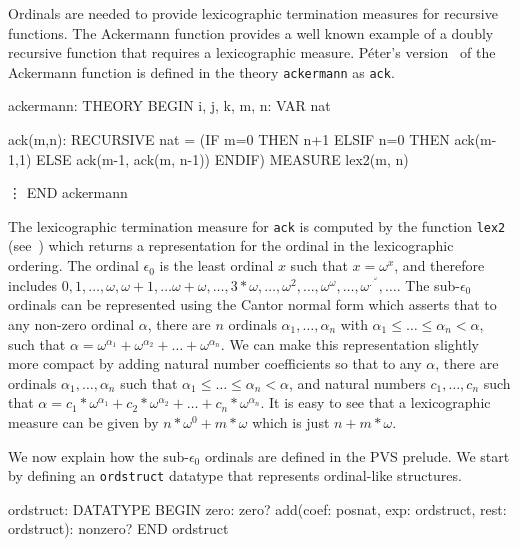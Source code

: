 \documentclass[11pt,twoside]{book}
\newcommand{\pvsref}[1]{\fbox{\footnotesize\ref{#1}}} \def\id#1{\hbox{\textt{#1}}} %
\begin{document}
Ordinals are needed to provide lexicographic termination measures for
recursive functions.  The Ackermann function provides a well known example
of a doubly recursive function that requires a lexicographic measure.
P\'eter's version~\cite{PETER} of the Ackermann function is defined in the
theory \texttt{ackermann} as \texttt{ack}\@.
\begin{session*}\label{ackermann}
ackermann: THEORY
BEGIN
i, j, k, m, n: VAR nat

ack(m,n): RECURSIVE nat =
  (IF m=0 THEN n+1
          ELSIF n=0 THEN ack(m-1,1)
                    ELSE ack(m-1, ack(m, n-1))
        ENDIF)
  MEASURE lex2(m, n)

  \vdots
END ackermann
\end{session*}
The lexicographic termination measure for \texttt{ack} is computed by
the function \texttt{lex2} (see~\pvsref{lex2})
which returns a representation for the
ordinal in the lexicographic ordering.  The ordinal $\epsilon_0$ is the
least ordinal $x$ such that $x = \omega^x$, and therefore includes
$0, 1, \ldots, \omega, \omega+1,\ldots \omega + \omega, \ldots, 3*\omega,
\ldots, \omega^2,\ldots, \omega^\omega, \ldots, \omega^{.^{.^\omega}}, \ldots.$
The sub-$\epsilon_0$ ordinals can be represented using the Cantor normal
form which asserts that to any non-zero ordinal $\alpha$,  there are $n$
ordinals $\alpha_1, \ldots, \alpha_n$ with $\alpha_1 \leq
\ldots \leq 
\alpha_n < \alpha$, such that $\alpha = \omega^{\alpha_1} + \omega^{\alpha_2}
+ \ldots 
+ \omega^{\alpha_n}$\@.  We can make this representation slightly more
compact by adding natural number coefficients so that to any $\alpha$,
there are ordinals $\alpha_1,\ldots, \alpha_n$ such that
$\alpha_1 \leq \ldots \leq \alpha_n < \alpha$,  and
natural numbers $c_1,\ldots, c_n$ 
such that $\alpha = c_1 * \omega^{\alpha_1} + c_2 * \omega^{\alpha_2} + \ldots
+ c_n * \omega^{\alpha_n}$\@.  It is easy to see that a lexicographic
measure can be given by $n * \omega^0 + m * \omega$ which is just $n + m* \omega$\@.  

We now explain how the sub-$\epsilon_0$ ordinals are defined in the PVS
prelude.   We start by defining an
\texttt{ordstruct} datatype that represents ordinal-like structures.
\begin{session*}
ordstruct: DATATYPE
 BEGIN
  zero: zero?
  add(coef: posnat, exp: ordstruct, rest: ordstruct): nonzero?
 END ordstruct
\end{session*}
\end{document}
